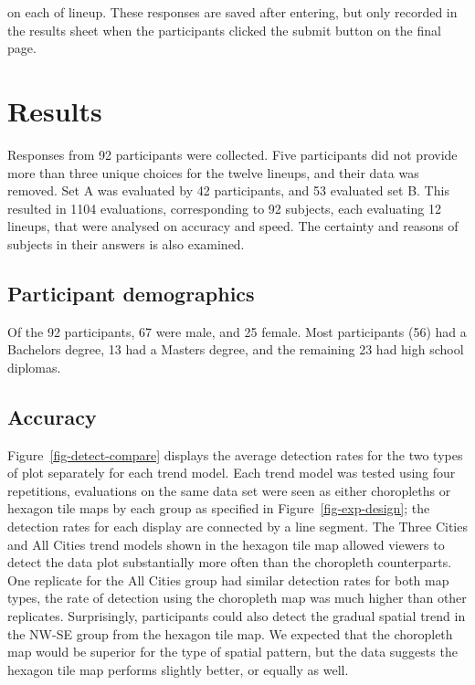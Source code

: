 \documentclass[
doublespace,
  times]{anzsauth}
\begin{document}
on each of lineup. These responses are saved after entering, but only
recorded in the results sheet when the participants clicked the submit
button on the final page.

\section{Results}\label{sec-results}

Responses from 92 participants were collected. Five participants did not
provide more than three unique choices for the twelve lineups, and their
data was removed. Set A was evaluated by 42 participants, and 53
evaluated set B. This resulted in 1104 evaluations, corresponding to 92
subjects, each evaluating 12 lineups, that were analysed on accuracy and
speed. The certainty and reasons of subjects in their answers is also
examined.

\subsection{Participant demographics}\label{participant-demographics}

Of the 92 participants, 67 were male, and 25 female. Most participants
(56) had a Bachelors degree, 13 had a Masters degree, and the remaining
23 had high school diplomas.

\subsection{Accuracy}\label{accuracy}

Figure~\ref{fig-detect-compare} displays the average detection rates for
the two types of plot separately for each trend model. Each trend model
was tested using four repetitions, evaluations on the same data set were
seen as either choropleths or hexagon tile maps by each group as
specified in Figure~\ref{fig-exp-design}; the detection rates for each
display are connected by a line segment. The Three Cities and All Cities
trend models shown in the hexagon tile map allowed viewers to detect the
data plot substantially more often than the choropleth counterparts. One
replicate for the All Cities group had similar detection rates for both
map types, the rate of detection using the choropleth map was much
higher than other replicates. Surprisingly, participants could also
detect the gradual spatial trend in the NW-SE group from the hexagon
tile map. We expected that the choropleth map would be superior for the
type of spatial pattern, but the data suggests the hexagon tile map
performs slightly better, or equally as well.
\end{document}
